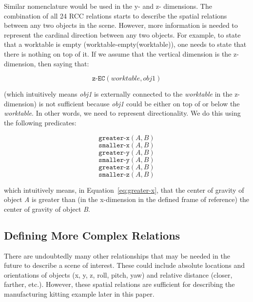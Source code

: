 \documentclass[preprint,12pt]{elsarticle}
\newcommand{\obj}[1] {\textit{#1}}
\begin{document}
Similar nomenclature would be used in the y- and z- dimensions. The combination of all 24 RCC relations starts to describe the spatial relations between any two objects in the scene. However, more information is needed to represent the cardinal direction between any two objects. For example, to state that a worktable is empty (worktable-empty(worktable)), one needs to state that there is nothing on top of it. If we assume that the vertical dimension is the z-dimension, then saying that:

\begin{equation}\label{eq:z-EC}
\texttt{z-EC}(\textit{worktable}, \textit{obj1})
\end{equation}

(which intuitively means \obj{obj1} is externally connected to the \obj{worktable} in the z-dimension) is not sufficient because \obj{obj1} could be either on top of or below the \obj{worktable}. In other words, we need to represent directionality. We do this using the following predicates:

\begin{equation}\label{eq:greater-x}
\texttt{greater-x}(\textit{A}, \textit{B})
\end{equation}
\begin{equation}\label{eq:smaller-x}
\texttt{smaller-x}(\textit{A}, \textit{B})
\end{equation}
\begin{equation}\label{eq:greater-y}
\texttt{greater-y}(\textit{A}, \textit{B})
\end{equation}
\begin{equation}\label{eq:smaller-y}
\texttt{smaller-y}(\textit{A}, \textit{B})
\end{equation}
\begin{equation}\label{eq:greater-z}
\texttt{greater-z}(\textit{A}, \textit{B})
\end{equation}
\begin{equation}\label{eq:smaller-z}
\texttt{smaller-z}(\textit{A}, \textit{B})
\end{equation}

which intuitively means, in Equation~\ref{eq:greater-x}, that the center of gravity of object \textit{A} is greater than (in the x-dimension in the defined frame of reference) the center of gravity of object \textit{B}.

\subsection{Defining More Complex Relations}
There are undoubtedly many other relationships that may be needed in the future to describe a scene of interest. These could include absolute locations and orientations of objects (x, y, z, roll, pitch, yaw) and relative distance (closer, farther, etc.). However, these spatial relations are sufficient for describing the manufacturing kitting example later in this paper.
\end{document}
